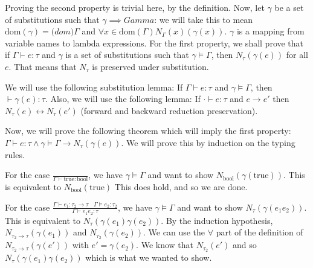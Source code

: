 Proving the second property is trivial here, by the definition. Now, let $\gamma$ be a set of substitutions
such that $\gamma \implies Gamma$: we will take this to mean
$\mathrm{dom}(\gamma) = \mathrm(dom){\Gamma}$ and $\forall x\in \mathrm{dom}(\Gamma) N_\Gamma(x) (\gamma(x))$.
$\gamma$ is a mapping from variable names to lambda expressions.
For the first property, we shall prove that if $\Gamma \vdash e : \tau$ and $\gamma$ is a set of substitutions
such that $\gamma \models \Gamma$, then $N_\tau(\gamma(e))$ for all $e$. That means that $N_\tau$ is preserved
under substitution.

We will use the following substitution lemma: If $\Gamma \vdash e : \tau$ and $\gamma \models \Gamma$, 
then $\vdash \gamma(e) : \tau$. Also, we will use the following lemma: If $\cdot \vdash e : \tau$ and
$e \to e'$ then $N_\tau (e) \leftrightarrow N_\tau (e')$ (forward and backward reduction preservation).

Now, we will prove the following theorem which will imply the first property: 
$\Gamma \vdash e : \tau \wedge \gamma \models \Gamma \to N_\tau (\gamma(e))$. 
We will prove this by induction on the typing rules.

For the case $\frac{}{\Gamma \vdash \mathrm{true} : \mathrm{bool}}$, we have $\gamma \models \Gamma$
and want to show $N_\mathrm{bool} (\gamma(\mathrm{true}))$. This is equivalent to $N_\mathrm{bool} (\mathrm{true})$
This does hold, and so we are done.

For the case $\frac{\Gamma \vdash e_1 : \tau_2 \to \tau~~~~\Gamma \models e_2 : \tau_2}{\Gamma \vdash e_1 e_2 : \tau}$, 
we have $\gamma \models \Gamma$ and want to show $N_\tau (\gamma(e_1 e_2))$. 
This is equivalent to $N_\tau (\gamma(e_1) \gamma(e_2))$.
By the induction hypothesis, $N_{\tau_2 \to \tau}(\gamma(e_1))$ and $N_{\tau_2}(\gamma(e_2))$.
We can use the $\forall$ part of the definition of $N_{\tau_2 \to \tau}(\gamma(e'))$ with $e' = \gamma(e_2)$. 
We know that $N_{\tau_2} (e')$ and so $N_\tau (\gamma(e_1) \gamma(e_2))$ which is what we wanted to show.

